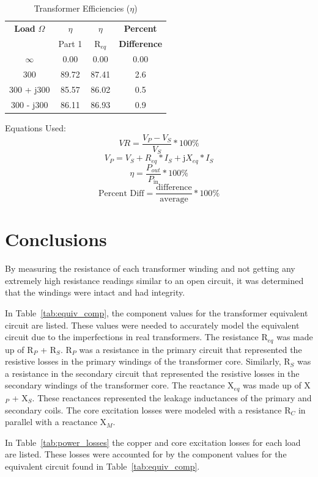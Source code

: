 \documentclass{article}
\begin{document}
\begin{table}[H]
  \centering
  \begin{tabular}{*{4}{c}}
    \textbf{Load} $\Omega$ & $\eta$ & $\eta$ & \textbf{Percent} \\
    & Part 1 & R$_{eq}$ & \textbf{Difference} \\
    \hline
    $\infty$ & 0.00 & 0.00 & 0.00 \\
    300 & 89.72 & 87.41 & 2.6 \\
    300 + j300 & 85.57 & 86.02 & 0.5 \\
    300 - j300 & 86.11 & 86.93 & 0.9 \\
  \end{tabular}
  \caption{Transformer Efficiencies ($\eta$)}
  \label{tab:eff}
\end{table}

Equations Used:
\[VR = \frac{V_P - V_S}{V_S} * 100\%\]
\[V_P = V_S + R_{eq} * I_S + \text{j}X_{eq} * I_S\]
\[\eta = \frac{P_{out}}{P_\text{in}} * 100\% \]
\[\text{Percent Diff} = \frac{\text{difference}}{\text{average}} * 100\%\]

\section{Conclusions}

By measuring the resistance of each transformer winding and not getting any
extremely high resistance readings similar to an open circuit, it was
determined that the windings were intact and had integrity.

In Table~\ref{tab:equiv_comp}, the component values for the transformer
equivalent circuit are listed. These values were needed to accurately model the
equivalent circuit due to the imperfections in real transformers. The
resistance R$_{eq}$ was made up of R$_P$ + R$_S$. R$_P$ was a resistance in the
primary circuit that represented the resistive losses in the primary windings
of the transformer core. Similarly, R$_S$ was a resistance in the secondary
circuit that represented the resistive losses in the secondary windings of the
transformer core. The reactance X$_{eq}$ was made up of X$_P$ + X$_S$. These
reactances represented the leakage inductances of the primary and secondary
coils.  The core excitation losses were modeled with a resistance R$_C$ in
parallel with a reactance X$_M$.

In Table~\ref{tab:power_losses} the copper and core excitation losses for each
load are listed. These losses were accounted for by the component values for
the equivalent circuit found in Table~\ref{tab:equiv_comp}.
\end{document}
